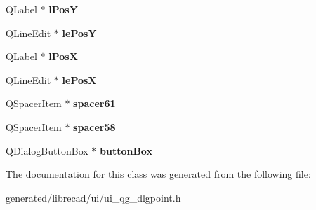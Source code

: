 \begin{DoxyCompactItemize}
\item 
\hypertarget{classUi__QG__DlgPoint_af183dfac724f10f92782762dfd72d006}{Q\-Label $\ast$ {\bfseries l\-Pos\-Y}}\label{classUi__QG__DlgPoint_af183dfac724f10f92782762dfd72d006}

\item 
\hypertarget{classUi__QG__DlgPoint_a31396e51a3e3fc34dc4fa312030a18fd}{Q\-Line\-Edit $\ast$ {\bfseries le\-Pos\-Y}}\label{classUi__QG__DlgPoint_a31396e51a3e3fc34dc4fa312030a18fd}

\item 
\hypertarget{classUi__QG__DlgPoint_a8f690d9a0c385f6d371e9e4cabb3c749}{Q\-Label $\ast$ {\bfseries l\-Pos\-X}}\label{classUi__QG__DlgPoint_a8f690d9a0c385f6d371e9e4cabb3c749}

\item 
\hypertarget{classUi__QG__DlgPoint_a414785baf91bf5bccf2f64bc056cc1d5}{Q\-Line\-Edit $\ast$ {\bfseries le\-Pos\-X}}\label{classUi__QG__DlgPoint_a414785baf91bf5bccf2f64bc056cc1d5}

\item 
\hypertarget{classUi__QG__DlgPoint_a4752af59548e8540e76db44822c9a94b}{Q\-Spacer\-Item $\ast$ {\bfseries spacer61}}\label{classUi__QG__DlgPoint_a4752af59548e8540e76db44822c9a94b}

\item 
\hypertarget{classUi__QG__DlgPoint_ace9f31d349d777a5babd29e47af596c5}{Q\-Spacer\-Item $\ast$ {\bfseries spacer58}}\label{classUi__QG__DlgPoint_ace9f31d349d777a5babd29e47af596c5}

\item 
\hypertarget{classUi__QG__DlgPoint_a105984217d4bffad22f0cd05436c8bf3}{Q\-Dialog\-Button\-Box $\ast$ {\bfseries button\-Box}}\label{classUi__QG__DlgPoint_a105984217d4bffad22f0cd05436c8bf3}

\end{DoxyCompactItemize}


The documentation for this class was generated from the following file\-:\begin{DoxyCompactItemize}
\item 
generated/librecad/ui/ui\-\_\-qg\-\_\-dlgpoint.\-h\end{DoxyCompactItemize}
